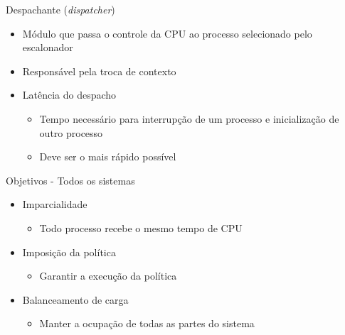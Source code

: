\documentclass[aspectratio=169,
				xcolor=table]{beamer}
\begin{document}
	\begin{frame}{Despachante (\textit{dispatcher})}
		\begin{itemize}
			\item Módulo que passa o controle da CPU ao processo selecionado pelo escalonador
			\vspace{1em}
			\item Responsável pela troca de contexto
			\vspace{1em}
			\item Latência do despacho
			\begin{itemize}
				\item Tempo necessário para interrupção de um processo e inicialização de outro processo
				\item Deve ser o mais rápido possível
			\end{itemize}
		\end{itemize}			
	\end{frame}	
	
	\begin{frame}{Objetivos - Todos os sistemas}
		\begin{itemize}
			\item Imparcialidade
			\begin{itemize}
				\item Todo processo recebe o mesmo tempo de CPU
			\end{itemize}
			\vspace{1em}
			\item Imposição da política
			\begin{itemize}
				\item Garantir a execução da política 
			\end{itemize}
			\vspace{1em}
			\item Balanceamento de carga					
			\begin{itemize}
				\item Manter a ocupação de todas as partes do sistema
			\end{itemize}
		\end{itemize}
	\end{frame}
	
\end{document}
